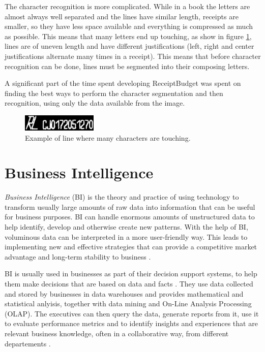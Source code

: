 The character recognition is more complicated. While in a book the letters are almost always well separated and the lines have similar length, receipts are smaller, so they have less space available and everything is compressed as much as possible. This means that many letters end up touching, as show in figure \ref{fig:line}, lines are of uneven length and have different justifications (left, right and center justifications alternate many times in a receipt). This means that before character recognition can be done, lines must be segmented into their composing letters. 

A significant part of the time spent developing ReceiptBudget was spent on finding the best ways to perform the character segmentation and then recognition, using only the data available from the image. 

\begin{figure}[h!]
\begin{center}
\includegraphics[width=0.7\columnwidth]{img/linie_bon.jpg}
\caption{\label{fig:line}
Example of line where many characters are touching.}
\end{center}
\end{figure}

\section{Business Intelligence}
\textit{Business Intelligence} (BI) is the theory and practice of using technology to transform usually large amounts of raw data into information that can be useful for business purposes. BI can handle enormous amounts of unstructured data to help identify, develop and otherwise create new patterns. With the help of BI, voluminous data can be interpreted in a more user-friendly way. This leads to implementing new and effective strategies that can provide a competitive market advantage and long-term stability to business \cite{rud2009business}.

BI is usually used in businesses as part of their decision support systems, to help them make decisions that are based on data and facts \cite{power2007brief}. They use data collected and stored by businesses in data warehouses and provides mathematical and statistical anlyisis, together with data mining and On-Line Analysis Processing (OLAP). The executives can then query the data, generate reports from it, use it  to evaluate performance metrics and to identify insights and experiences that are relevant business knowledge, often in a collaborative way, from different departements \cite{Ghazanfari20111579}. 

